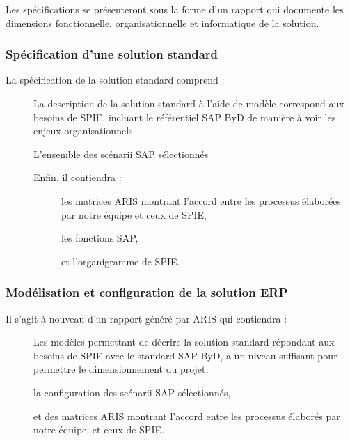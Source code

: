 Les spécifications se présenteront sous la forme d’un rapport qui documente les dimensions fonctionnelle, organisationnelle et informatique de la solution.

\subsubsection{Spécification d’une solution standard}

La spécification de la solution standard comprend : \\
\begin{description}
    \item[\textbullet] La description de la solution standard à l’aide de modèle correspond aux besoins de SPIE, incluant le référentiel SAP ByD de manière à voir les enjeux organisationnels
    \item[\textbullet] L’ensemble des scénarii SAP sélectionnés
    \item[\textbullet] Enfin, il contiendra :
        \begin{description}
            \item[\textbullet] les matrices ARIS montrant l’accord entre les processus élaborées par notre équipe et ceux de SPIE,
            \item[\textbullet] les fonctions SAP,
            \item[\textbullet] et l’organigramme de SPIE.
        \end{description}
\end{description}

\subsubsection{Modélisation et configuration de la solution ERP}

Il s’agit à nouveau d’un rapport généré par ARIS qui contiendra : \\

\begin{description}
    \item[\textbullet] Les modèles permettant de décrire la solution standard répondant aux besoins de SPIE avec le standard SAP ByD, a un niveau suffisant pour permettre le dimensionnement du projet, 
    \item[\textbullet] la configuration des scénarii SAP sélectionnés,
    \item[\textbullet] et des matrices ARIS montrant l’accord entre les processus élaborés par notre équipe, et ceux de SPIE.
\end{description}

